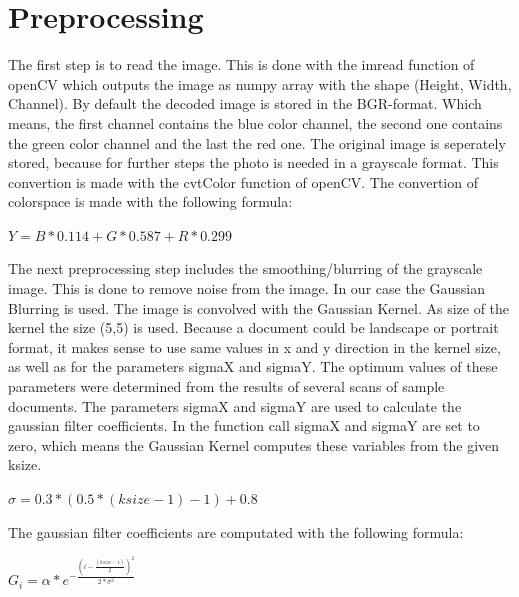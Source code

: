 \documentclass[twocolumn,10pt]{asme2ej}
\begin{document}
\section{Preprocessing}
\label{section:preprocessing}

The first step is to read the image. This is done with the imread function of openCV which 
outputs the image as numpy array with the shape (Height, Width, Channel).
By default the decoded image is stored in the BGR-format. Which means, the first channel contains the
blue color channel, the second one contains the green color channel and the last the red one.
The original image is seperately stored, because for further steps the photo is needed in a grayscale format.
This convertion is made with the cvtColor\cite{opencv_cvtColor} function of openCV. The convertion of colorspace is made with the following
formula\cite{opencv_rgb2gray}:
\begin{center}
    $Y = B * 0.114 + G * 0.587 + R * 0.299$
    \label{eq_rgb2gray}
\end{center}
The next preprocessing step includes the smoothing/blurring of the grayscale image.
This is done to remove noise from the image\cite{opencv_smoothingimages}. In our case
the Gaussian Blurring\cite{opencv_gaussianblur} is used. The image is convolved with the Gaussian Kernel.
As size of the kernel the size (5,5) is used.
Because a document could be landscape or portrait format, 
it makes sense to use same values in x and y direction in the kernel size, as well as for the parameters
sigmaX and sigmaY.
The optimum values of these parameters were determined from the results of several scans of sample documents.
The parameters sigmaX and sigmaY are used to calculate the gaussian filter coefficients. In the function call
sigmaX and sigmaY are set to zero, which means the Gaussian Kernel computes these variables from the given
ksize\cite{opencv_getgaussiankernel}.
\begin{center}
    $\sigma = 0.3 * (0.5 * (ksize - 1 ) - 1) + 0.8$
    \label{eq_sigma}
\end{center}
The gaussian filter coefficients are computated with the following formula\cite{opencv_getgaussiankernel}:
\begin{center}
    $G_i = \alpha * e^{- \frac{(i - \frac{(ksize - 1)}{2})^2}{2*\sigma^2 } }$
    \label{eq_sigma}
\end{center}
\end{document}
